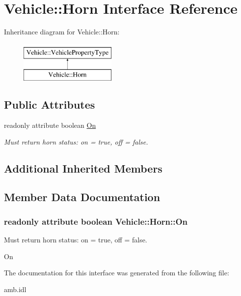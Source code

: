 \hypertarget{interfaceVehicle_1_1Horn}{\section{Vehicle\-:\-:Horn Interface Reference}
\label{interfaceVehicle_1_1Horn}
}
Inheritance diagram for Vehicle\-:\-:Horn\-:\begin{figure}[H]
\begin{center}
\leavevmode
\includegraphics[height=2.000000cm]{interfaceVehicle_1_1Horn}
\end{center}
\end{figure}
\subsection*{Public Attributes}
\begin{DoxyCompactItemize}
\item 
readonly attribute boolean \hyperlink{interfaceVehicle_1_1Horn_afdb0a7aa24be8f9bc91303424b614f01}{On}
\begin{DoxyCompactList}\small\item\em Must return horn status\-: on = true, off = false. \end{DoxyCompactList}\end{DoxyCompactItemize}
\subsection*{Additional Inherited Members}


\subsection{Member Data Documentation}
\hypertarget{interfaceVehicle_1_1Horn_afdb0a7aa24be8f9bc91303424b614f01}{
\subsubsection[{On}]{\setlength{\rightskip}{0pt plus 5cm}readonly attribute boolean Vehicle\-::\-Horn\-::\-On}}\label{interfaceVehicle_1_1Horn_afdb0a7aa24be8f9bc91303424b614f01}


Must return horn status\-: on = true, off = false. 

On 

The documentation for this interface was generated from the following file\-:\begin{DoxyCompactItemize}
\item 
amb.\-idl\end{DoxyCompactItemize}
